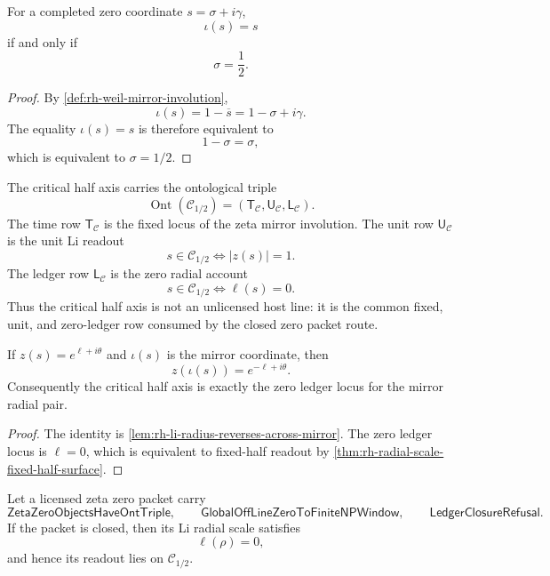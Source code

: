 \begin{theorem}
\label{thm:rh-critical-half-axis-mirror-fixed-locus}
For a completed zero coordinate $s=\sigma+i\gamma$,
$$
\iota(s)=s
$$
if and only if
$$
\sigma=\frac12.
$$
\end{theorem}

\begin{proof}
By \autoref{def:rh-weil-mirror-involution},
$$
\iota(s)=1-\overline{s}=1-\sigma+i\gamma.
$$
The equality $\iota(s)=s$ is therefore equivalent to
$$
1-\sigma=\sigma,
$$
which is equivalent to $\sigma=1/2$.
\end{proof}

\begin{definition}
\label{def:rh-critical-half-axis-triple}
The critical half axis carries the ontological triple
$$
\operatorname{Ont}(\mathcal C_{1/2})
=
(\mathsf T_{\mathcal C},\mathsf U_{\mathcal C},\mathsf L_{\mathcal C}).
$$
The time row $\mathsf T_{\mathcal C}$ is the fixed locus of the zeta
mirror involution.  The unit row $\mathsf U_{\mathcal C}$ is the unit
Li readout
$$
s\in\mathcal C_{1/2}
\Longleftrightarrow
|z(s)|=1.
$$
The ledger row $\mathsf L_{\mathcal C}$ is the zero radial account
$$
s\in\mathcal C_{1/2}
\Longleftrightarrow
\ell(s)=0.
$$
Thus the critical half axis is not an unlicensed host line: it is the
common fixed, unit, and zero-ledger row consumed by the closed zero
packet route.
\end{definition}

\begin{theorem}
\label{thm:rh-critical-half-axis-reverses-radial-ledger}
If $z(s)=e^{\ell+i\theta}$ and $\iota(s)$ is the mirror coordinate,
then
$$
z(\iota(s))=e^{-\ell+i\theta}.
$$
Consequently the critical half axis is exactly the zero ledger locus for
the mirror radial pair.
\end{theorem}

\begin{proof}
The identity is \autoref{lem:rh-li-radius-reverses-across-mirror}.  The
zero ledger locus is $\ell=0$, which is equivalent to fixed-half readout
by \autoref{thm:rh-radial-scale-fixed-half-surface}.
\end{proof}

\begin{theorem}
\label{thm:rh-closed-radial-packets-lie-critical-half-axis}
Let a licensed zeta zero packet carry
$$
\mathsf{ZetaZeroObjectsHaveOntTriple},
\qquad
\mathsf{GlobalOffLineZeroToFiniteNPWindow},
\qquad
\mathsf{LedgerClosureRefusal}.
$$
If the packet is closed, then its Li radial scale satisfies
$$
\ell(\rho)=0,
$$
and hence its readout lies on $\mathcal C_{1/2}$.
\end{theorem}

